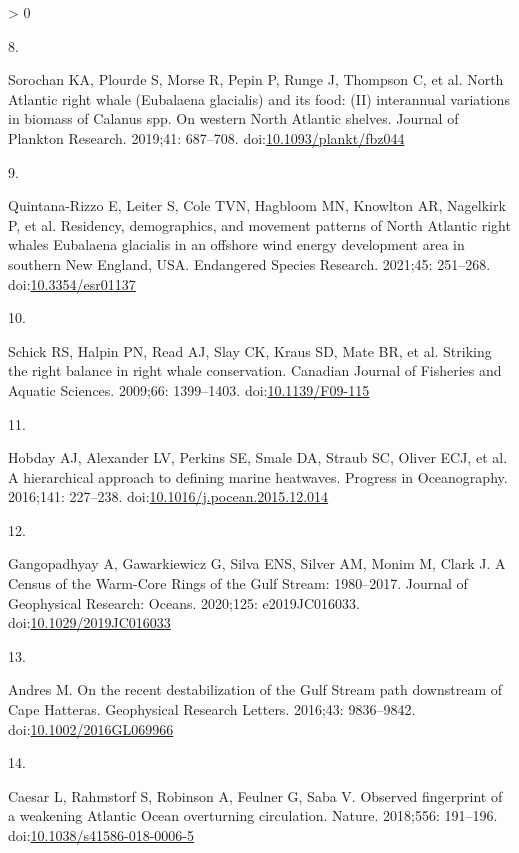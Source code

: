 \documentclass[
  10pt,
]{article}
\newlength{\cslhangindent}
\newlength{\csllabelwidth}
\newenvironment{CSLReferences}[2] %
 {%
  \setlength{\parindent}{0pt}
  \ifodd #1 \everypar{\setlength{\hangindent}{\cslhangindent}}\ignorespaces\fi
  \ifnum #2 > 0
  \setlength{\parskip}{#2\baselineskip}
  \fi
 }%
 {}
\newcommand{\CSLLeftMargin}[1]{\parbox[t]{\csllabelwidth}{#1}}
\newcommand{\CSLRightInline}[1]{\parbox[t]{\linewidth - \csllabelwidth}{#1}\break}
\begin{document}
\begin{CSLReferences}{0}{0}
\leavevmode\hypertarget{ref-sorochan_north_2019}{}%
\CSLLeftMargin{8. }
\CSLRightInline{Sorochan KA, Plourde S, Morse R, Pepin P, Runge J,
Thompson C, et al. North {Atlantic} right whale ({Eubalaena} glacialis)
and its food: ({II}) interannual variations in biomass of {Calanus} spp.
On western {North} {Atlantic} shelves. Journal of Plankton Research.
2019;41: 687--708.
doi:\href{https://doi.org/10.1093/plankt/fbz044}{10.1093/plankt/fbz044}}

\leavevmode\hypertarget{ref-quintana-rizzo_residency_2021}{}%
\CSLLeftMargin{9. }
\CSLRightInline{Quintana-Rizzo E, Leiter S, Cole TVN, Hagbloom MN,
Knowlton AR, Nagelkirk P, et al. Residency, demographics, and movement
patterns of {North} {Atlantic} right whales {Eubalaena} glacialis in an
offshore wind energy development area in southern {New} {England},
{USA}. Endangered Species Research. 2021;45: 251--268.
doi:\href{https://doi.org/10.3354/esr01137}{10.3354/esr01137}}

\leavevmode\hypertarget{ref-schick_striking_2009}{}%
\CSLLeftMargin{10. }
\CSLRightInline{Schick RS, Halpin PN, Read AJ, Slay CK, Kraus SD, Mate
BR, et al. Striking the right balance in right whale conservation.
Canadian Journal of Fisheries and Aquatic Sciences. 2009;66: 1399--1403.
doi:\href{https://doi.org/10.1139/F09-115}{10.1139/F09-115}}

\leavevmode\hypertarget{ref-hobday_hierarchical_2016}{}%
\CSLLeftMargin{11. }
\CSLRightInline{Hobday AJ, Alexander LV, Perkins SE, Smale DA, Straub
SC, Oliver ECJ, et al. A hierarchical approach to defining marine
heatwaves. Progress in Oceanography. 2016;141: 227--238.
doi:\href{https://doi.org/10.1016/j.pocean.2015.12.014}{10.1016/j.pocean.2015.12.014}}

\leavevmode\hypertarget{ref-gangopadhyay_census_2020}{}%
\CSLLeftMargin{12. }
\CSLRightInline{Gangopadhyay A, Gawarkiewicz G, Silva ENS, Silver AM,
Monim M, Clark J. A {Census} of the {Warm}-{Core} {Rings} of the {Gulf}
{Stream}: 1980--2017. Journal of Geophysical Research: Oceans. 2020;125:
e2019JC016033.
doi:\href{https://doi.org/10.1029/2019JC016033}{10.1029/2019JC016033}}

\leavevmode\hypertarget{ref-andres_recent_2016}{}%
\CSLLeftMargin{13. }
\CSLRightInline{Andres M. On the recent destabilization of the {Gulf}
{Stream} path downstream of {Cape} {Hatteras}. Geophysical Research
Letters. 2016;43: 9836--9842.
doi:\href{https://doi.org/10.1002/2016GL069966}{10.1002/2016GL069966}}

\leavevmode\hypertarget{ref-caesar_observed_2018}{}%
\CSLLeftMargin{14. }
\CSLRightInline{Caesar L, Rahmstorf S, Robinson A, Feulner G, Saba V.
Observed fingerprint of a weakening {Atlantic} {Ocean} overturning
circulation. Nature. 2018;556: 191--196.
doi:\href{https://doi.org/10.1038/s41586-018-0006-5}{10.1038/s41586-018-0006-5}}


\end{CSLReferences}
\end{document}
